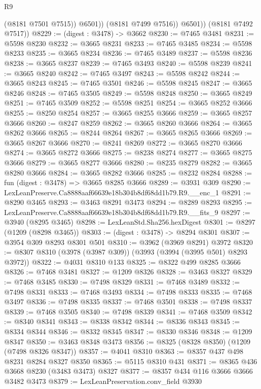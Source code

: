 \begin{lexlean}{R9}
\begin{coremodule}
                  (@8181 @7501 @7515))
                @6501))
            (@8181 @7499 @7516))
          @6501))
      (@8181 @7492 @7517))
@8229 := (digest : @3478) -> @3662
@8230 := @7465 @3481
@8231 := @5598 @8230
@8232 := @3665 @8231
@8233 := @7465 @3485
@8234 := @5598 @8233
@8235 := @3665 @8234
@8236 := @7465 @3489
@8237 := @5598 @8236
@8238 := @3665 @8237
@8239 := @7465 @3493
@8240 := @5598 @8239
@8241 := @3665 @8240
@8242 := @7465 @3497
@8243 := @5598 @8242
@8244 := @3665 @8243
@8245 := @7465 @3501
@8246 := @5598 @8245
@8247 := @3665 @8246
@8248 := @7465 @3505
@8249 := @5598 @8248
@8250 := @3665 @8249
@8251 := @7465 @3509
@8252 := @5598 @8251
@8254 := @3665 @8252 @3666
@8255 := @8250 @8254
@8257 := @3665 @8255 @3666
@8259 := @3665 @8257 @3666
@8260 := @8247 @8259
@8262 := @3665 @8260 @3666
@8264 := @3665 @8262 @3666
@8265 := @8244 @8264
@8267 := @3665 @8265 @3666
@8269 := @3665 @8267 @3666
@8270 := @8241 @8269
@8272 := @3665 @8270 @3666
@8274 := @3665 @8272 @3666
@8275 := @8238 @8274
@8277 := @3665 @8275 @3666
@8279 := @3665 @8277 @3666
@8280 := @8235 @8279
@8282 := @3665 @8280 @3666
@8284 := @3665 @8282 @3666
@8285 := @8232 @8284
@8288 := fun (digest : @3478) => @3665 @8285 @3666
@8289 := @3931 @309
@8290 := LexLeanPreserve.Ca8888aaf66639e18b304b8df68dd1b79.R9.__enc_1
@8291 := @8290 @3465
@8293 := @3463 @8291 @3473
@8294 := @8289 @8293
@8295 := LexLeanPreserve.Ca8888aaf66639e18b304b8df68dd1b79.R9.__fits_9
@8297 := @3940 (@8295 @3465)
@8298 := LexLeanStd.Sha256.hexDigest
@8301 := @8297 (@1209 (@8298 @3465))
@8303 := (digest : @3478) -> @8294 @8301
@8307 := @3954 @309 @8293 @8301 @501
@8310 := @3962 (@3969 @8291) @3972
@8320 := @8307 @8310 (@3978 (@3987 @309)) (@3993 (@3994 (@3995 @501) @8293 @3972))
@8322 := @4031 @8310 @133
@8325 := @8322 @499 @8285 @3666
@8326 := @7468 @3481
@8327 := @1209 @8326
@8328 := @3463 @8327
@8329 := @7468 @3485
@8330 := @7498 @8329
@8331 := @7468 @3489
@8332 := @7498 @8331
@8333 := @7468 @3493
@8334 := @7498 @8333
@8335 := @7468 @3497
@8336 := @7498 @8335
@8337 := @7468 @3501
@8338 := @7498 @8337
@8339 := @7468 @3505
@8340 := @7498 @8339
@8341 := @7468 @3509
@8342 := @8340 @8341
@8343 := @8338 @8342
@8344 := @8336 @8343
@8345 := @8334 @8344
@8346 := @8332 @8345
@8347 := @8330 @8346
@8348 := @1209 @8347
@8350 := @3463 @8348 @3473
@8356 := @8325 (@8328 @8350) (@1209 (@7498 @8326 @8347))
@8357 := @4041 @8310
@8363 := @8357 @437 @498 @8231 @8284 @8327 @8350
@8365 := @5115 @8310 @431
@8371 := @8365 @436 @3668 @8230 (@3483 @3473) @8327
@8377 := @8357 @434 @116 @3666 @3666 @3482 @3473
@8379 := LexLeanPreservation.conv_field @3930

\end{coremodule}
\end{lexlean}
